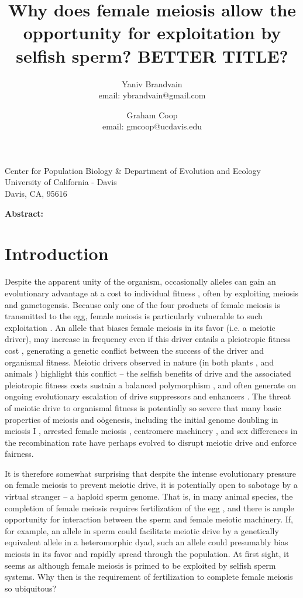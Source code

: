 \documentclass[12pt,letterpaper]{article}
\title{Why does female meiosis allow the opportunity for exploitation
  by selfish sperm? BETTER TITLE?}
\author{Yaniv Brandvain \\ email: ybrandvain@gmail.com  \and Graham Coop \\ email: gmcoop@ucdavis.edu }
\date{}
\begin{document}
\maketitle
\begin{center}
Center for Population Biology \& Department of Evolution and Ecology \\ University of California - Davis \\ Davis, CA, 95616
\end{center}

{\bf Abstract:}
\newpage

\section*{Introduction}

Despite the apparent unity of the organism, occasionally alleles can
gain an evolutionary advantage at a cost to  individual fitness
\citep{Burt2006}, often by exploiting meiosis and gametogensis.
Because only one of the four products of female meiosis is transmitted to the egg, female meiosis is particularly vulnerable to such exploitation \citep{Sandler1957,Pardo-ManuelDeVillena2001a}. 
An allele that biases female meiosis in its favor (i.e. a meiotic driver), may increase in frequency even if this driver entails a pleiotropic fitness cost \citep{Prout1973}, generating a genetic conflict between the success of the driver and organismal fitness.
Meiotic drivers observed in nature (in both plants
\citep{Buckler1999,Fishman2005,Fishman2008}, and animals
\citep{Agulnik1990,Wu2005,Pardo-ManuelDeVillena2001c}) highlight this
conflict -- the selfish benefits of drive and the associated
pleiotropic fitness costs sustain a balanced polymorphism
\citep{Prout1973}, 
and often generate on ongoing evolutionary escalation of drive suppressors and enhancers \citep{Dawe1996,Fishman2008}. 
The threat of meiotic drive to organismal fitness is potentially so
severe that many basic properties of
meiosis and o\"{o}genesis, including the initial genome doubling in
meiosis I \citep{Haig1991}, arrested female meiosis
\citep{Mira1998}, centromere machinery \citep{MalikHenikoff}, and sex differences in the recombination rate \citep{Haig2010,Brandvain2012} 
have perhaps evolved to disrupt meiotic drive and enforce fairness. 

It is therefore somewhat surprising that despite the intense evolutionary pressure on female meiosis to prevent meiotic drive, 
it is potentially open to sabotage by a virtual stranger -- a haploid sperm genome.
That is, in many animal species, the completion of female meiosis requires fertilization of the egg \citep{Masui_book}, 
and there is ample opportunity for interaction between the sperm and female meiotic machinery.
If, for example, an allele in sperm could facilitate meiotic drive by a genetically equivalent allele in a 
heteromorphic dyad, such an allele could presumably bias meiosis in its favor and rapidly spread through the population.
At first sight, it seems as although female meiosis is primed to be exploited by selfish sperm systems.  
Why then is the requirement of fertilization to complete female meiosis so ubiquitous? 
\end{document}
